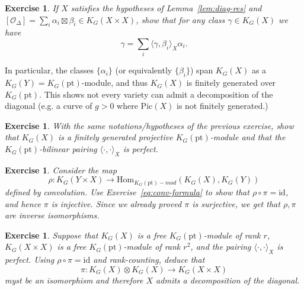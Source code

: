 \documentclass[11pt]{amsart}
\newtheorem{exercise}[dummy]{Exercise}
\theoremstyle{definition}
\newcommand{\Oc}{\mathcal{O}}
\newcommand{\Hom}{\mathrm{Hom}}
\newcommand{\Pic}{\mathrm{Pic}}
\numberwithin{equation}{subsection}
\numberwithin{figure}{subsection}
\newcommand{\pt}{\mathrm{pt}}
\begin{document}
\begin{exercise}
If $X$ satisfies the hypotheses of Lemma~\ref{lem:diag-res} and $[\Oc_\Delta]=\sum_i\alpha_i\boxtimes\beta_i\in K_G(X\times X)$, show that for any class $\gamma\in K_G(X)$ we have
$$
\gamma = \sum_i \langle \gamma,\beta_i\rangle_X \alpha_i.
$$
\end{exercise}
In particular, the classes $\{\alpha_i\}$ (or equivalently $\{\beta_i\}$) span $K_G(X)$ as a $K_G(Y)=K_G(\pt)$-module, and thus $K_G(X)$ is finitely generated over $K_G(\pt)$. This shows not every variety can admit a decomposition of the diagonal (e.g. a curve of $g>0$ where $\Pic(X)$ is not finitely generated.)

\begin{exercise}
With the same notations/hypotheses of the previous exercise, show that $K_G(X)$ is a finitely generated projective $K_G(\pt)$-module and that the $K_G(\pt)$-bilinear pairing $\langle\cdot,\cdot\rangle_X$ is perfect.
\end{exercise}

{
\begin{exercise}
Consider the map
$$
\rho\colon K_G(Y\times X)\rightarrow \Hom_{K_G(\pt)-mod}(K_G(X),K_G(Y))
$$
defined by convolution. Use Exercise~\ref{eq:conv-formula} to show that $\rho\circ\pi=\mathrm{id}$, and hence $\pi$ is injective. Since we already proved $\pi$ is surjective, we get that $\rho,\pi$ are inverse isomorphisms.
\end{exercise}
}

\begin{exercise}
\label{ex:alg-crit}
Suppose that $K_G(X)$ is a free $K_G(\pt)$-module of rank $r$, $K_G(X\times X)$ is a free $K_G(\pt)$-module of rank $r^2$, and the pairing $\langle\cdot,\cdot\rangle_X$ is perfect. Using $\rho\circ\pi=\mathrm{id}$ and rank-counting, deduce that 
$$
\pi\colon K_G(X)\otimes K_G(X)\rightarrow K_G(X\times X)
$$ myst be an isomorphism and therefore $X$ admits a decomposition of the diagonal.
\end{exercise}
\end{document}
